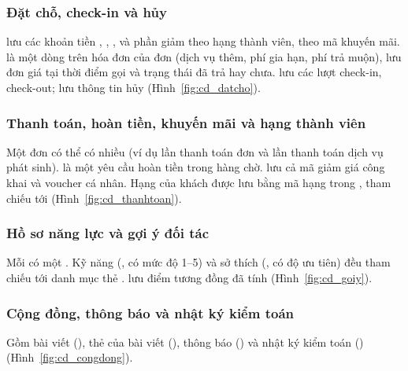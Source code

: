 
\subsubsection{Đặt chỗ, check-in và hủy}
 lưu các khoản tiền , , ,  và phần giảm theo hạng thành viên, theo mã khuyến mãi.  là một dòng trên hóa đơn của đơn (dịch vụ thêm, phí gia hạn, phí trả muộn), lưu đơn giá tại thời điểm gọi và trạng thái đã trả hay chưa.  lưu các lượt check-in, check-out;  lưu thông tin hủy (Hình~\ref{fig:cd_datcho}).


\subsubsection{Thanh toán, hoàn tiền, khuyến mãi và hạng thành viên}
Một đơn có thể có nhiều  (ví dụ lần thanh toán đơn và lần thanh toán dịch vụ phát sinh).  là một yêu cầu hoàn tiền trong hàng chờ.  lưu cả mã giảm giá công khai và voucher cá nhân. Hạng của khách được lưu bằng mã hạng trong , tham chiếu tới  (Hình~\ref{fig:cd_thanhtoan}).


\subsubsection{Hồ sơ năng lực và gợi ý đối tác}
Mỗi  có một . Kỹ năng (, có mức độ 1--5) và sở thích (, có độ ưu tiên) đều tham chiếu tới danh mục thẻ .  lưu điểm tương đồng đã tính (Hình~\ref{fig:cd_goiy}).


\subsubsection{Cộng đồng, thông báo và nhật ký kiểm toán}
Gồm bài viết (), thẻ của bài viết (), thông báo () và nhật ký kiểm toán () (Hình~\ref{fig:cd_congdong}).

